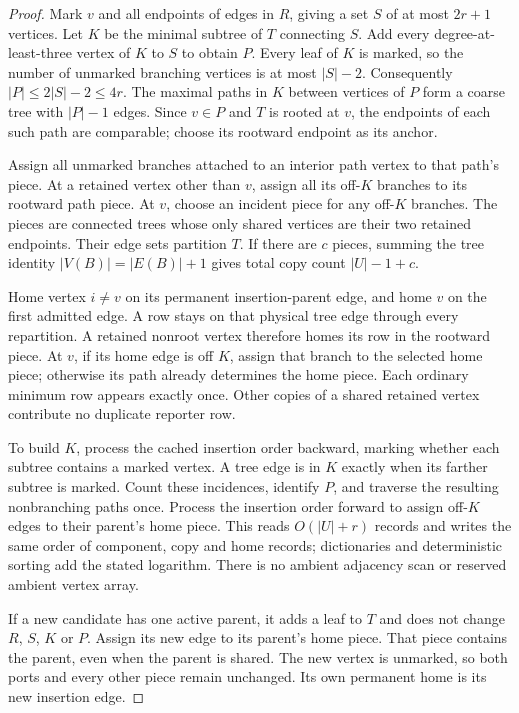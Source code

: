 \begin{proof}
Mark $v$ and all endpoints of edges in $R$, giving a set $S$ of at most
$2r+1$ vertices. Let $K$ be the minimal subtree of $T$ connecting $S$.
Add every degree-at-least-three vertex of $K$ to $S$ to obtain $P$.
Every leaf of $K$ is marked, so the number of unmarked branching vertices
is at most $|S|-2$. Consequently $|P|\leq2|S|-2\leq4r$.
The maximal paths in $K$ between vertices of $P$ form a coarse tree with
$|P|-1$ edges. Since $v\in P$ and $T$ is rooted at $v$, the endpoints of
each such path are comparable; choose its rootward endpoint as its anchor.

Assign all unmarked branches attached to an interior path vertex to that
path's piece. At a retained vertex other than $v$, assign all its off-$K$
branches to its rootward path piece. At $v$, choose an incident piece for
any off-$K$ branches. The pieces are connected trees whose only shared
vertices are their two retained endpoints. Their edge sets partition $T$.
If there are $c$ pieces, summing the tree identity
$|V(B)|=|E(B)|+1$ gives total copy count $|U|-1+c$.

Home vertex $i\ne v$ on its permanent insertion-parent edge, and home $v$
on the first admitted edge. A row stays on that physical tree edge through
every repartition. A retained nonroot vertex therefore homes its row in
the rootward piece. At $v$, if its home edge is off $K$, assign that branch
to the selected home piece; otherwise its path already determines the
home piece. Each ordinary minimum row appears exactly once. Other copies
of a shared retained vertex contribute no duplicate reporter row.

To build $K$, process the cached insertion order backward, marking whether
each subtree contains a marked vertex. A tree edge is in $K$ exactly when
its farther subtree is marked. Count these incidences, identify $P$, and
traverse the resulting nonbranching paths once. Process the insertion order
forward to assign off-$K$ edges to their parent's home piece. This reads
$O(|U|+r)$ records and writes the same order of component, copy and home
records; dictionaries and deterministic sorting add the stated logarithm.
There is no ambient adjacency scan or reserved ambient vertex array.

If a new candidate has one active parent, it adds a leaf to $T$ and does
not change $R$, $S$, $K$ or $P$. Assign its new edge to its parent's home
piece. That piece contains the parent, even when the parent is shared.
The new vertex is unmarked, so both ports and every other piece remain
unchanged. Its own permanent home is its new insertion edge.
\end{proof}

